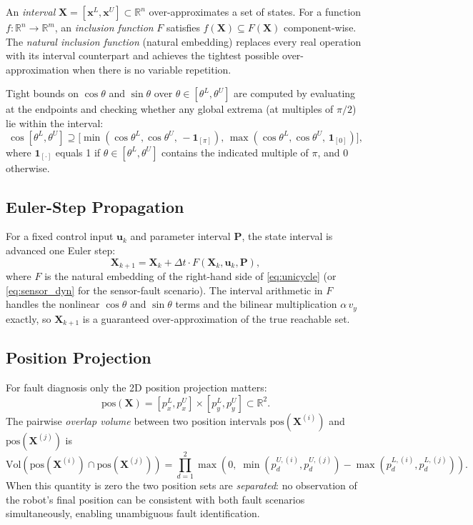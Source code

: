 \documentclass[11pt]{article}
\newcommand{\xvec}{\mathbf{x}}
\newcommand{\uvec}{\mathbf{u}}
\newcommand{\Xivl}{\mathbf{X}}
\newcommand{\Pivl}{\mathbf{P}}
\newcommand{\R}{\mathbb{R}}
\newcommand{\pos}{\mathrm{pos}}
\begin{document}
An \emph{interval} $\Xivl = [\xvec^L, \xvec^U] \subset \R^n$ over-approximates
a set of states. For a function $f : \R^n \to \R^m$, an \emph{inclusion
function} $F$ satisfies $f(\Xivl) \subseteq F(\Xivl)$ component-wise. The
\emph{natural inclusion function} (natural embedding) replaces every real
operation with its interval counterpart and achieves the tightest possible
over-approximation when there is no variable repetition.

Tight bounds on $\cos\theta$ and $\sin\theta$ over $\theta \in [\theta^L,\theta^U]$
are computed by evaluating at the endpoints and checking whether any global
extrema (at multiples of $\pi/2$) lie within the interval:
\[
  \cos[\theta^L, \theta^U] \supseteq
  \bigl[\min(\cos\theta^L, \cos\theta^U,\,-\mathbf{1}_{[\pi]}),\,
        \max(\cos\theta^L, \cos\theta^U,\, \mathbf{1}_{[0]})\bigr],
\]
where $\mathbf{1}_{[\cdot]}$ equals 1 if $\theta \in [\theta^L, \theta^U]$
contains the indicated multiple of $\pi$, and 0 otherwise.

\subsection{Euler-Step Propagation}

For a fixed control input $\uvec_k$ and parameter interval $\Pivl$, the
state interval is advanced one Euler step:
\begin{equation}
  \label{eq:euler_ivl}
  \Xivl_{k+1} = \Xivl_k + \Delta t\cdot F(\Xivl_k, \uvec_k, \Pivl),
\end{equation}
where $F$ is the natural embedding of the right-hand side of
\eqref{eq:unicycle} (or \eqref{eq:sensor_dyn} for the sensor-fault scenario).
The interval arithmetic in $F$ handles the nonlinear $\cos\theta$ and
$\sin\theta$ terms and the bilinear multiplication $\alpha\,v_y$ exactly, so
$\Xivl_{k+1}$ is a guaranteed over-approximation of the true reachable set.

\subsection{Position Projection}

For fault diagnosis only the 2D position projection matters:
\[
  \pos(\Xivl) = [p_x^L, p_x^U] \times [p_y^L, p_y^U] \subset \R^2.
\]
The pairwise \emph{overlap volume} between two position intervals
$\pos(\Xivl^{(i)})$ and $\pos(\Xivl^{(j)})$ is
\begin{equation}
  \label{eq:overlap}
  \mathrm{Vol}\!\left(\pos(\Xivl^{(i)}) \cap \pos(\Xivl^{(j)})\right)
  = \prod_{d=1}^{2} \max\!\left(0,\;
    \min(p_d^{U,(i)}, p_d^{U,(j)}) - \max(p_d^{L,(i)}, p_d^{L,(j)})
  \right).
\end{equation}
When this quantity is zero the two position sets are \emph{separated}: no
observation of the robot's final position can be consistent with both fault
scenarios simultaneously, enabling unambiguous fault identification.
\end{document}
